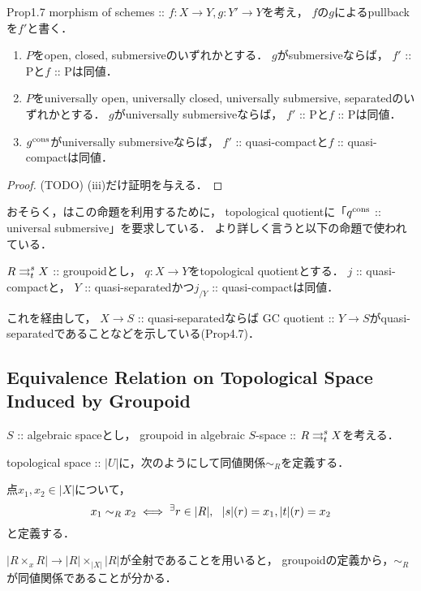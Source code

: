 \begin{Prop}{\cite{Rydh10} Prop1.7} \label{refrecting_property_of_pullback}
    morphism of schemes :: $f \colon X \to Y, g \colon Y' \to Y$を考え，
    $f$の$g$によるpullbackを$f'$と書く．
    \begin{enumerate}
    \item 
        $P$をopen, closed, submersiveのいずれかとする．
        $g$がsubmersiveならば，
        $f'$ :: Pと$f$ :: Pは同値．
    \item 
        $P$をuniversally open, universally closed, universally submersive, separatedのいずれかとする．
        $g$がuniversally submersiveならば，
        $f'$ :: Pと$f$ :: Pは同値．
    \item 
        $g^{\mathrm{cons}}$がuniversally submersiveならば，
        $f'$ :: quasi-compactと$f$ :: quasi-compactは同値．
    \end{enumerate}
\end{Prop}
\begin{proof}
    (TODO)
    (iii)だけ証明を与える．
\end{proof}

\begin{Remark}
    おそらく，\cite{Rydh13}はこの命題を利用するために，
    topological quotientに「$q^{\mathrm{cons}}$ :: universal submersive」を要求している．
    より詳しく言うと以下の命題で使われている．
    \begin{Prop}
        $R \mathrel{\mathop{\rightrightarrows}^{s}_{t}} X$ :: groupoidとし，
        $q \colon X \to Y$をtopological quotientとする．
        $j$ :: quasi-compactと，
        $Y$ :: quasi-separatedかつ$j_{/Y}$ :: quasi-compactは同値．
    \end{Prop}
    これを経由して，
    $X \to S$ :: quasi-separatedならば
    GC quotient :: $Y \to S$がquasi-separatedであることなどを示している(Prop4.7)．
\end{Remark}

\subsection{Equivalence Relation on Topological Space Induced by Groupoid}
$S$ :: algebraic spaceとし，
groupoid in algebraic $S$-space :: $R \mathrel{\mathop{\rightrightarrows}^{s}_{t}} X$を考える．

topological space :: $|U|$に，次のようにして同値関係$\sim_{R}$を定義する．
\begin{Def}
    点$x_1, x_2 \in |X|$について，
    \[ x_1 \sim_R x_2 \iff {}^{\exists} r \in |R|,~~ |s|(r)=x_1, |t|(r)=x_2 \]
    と定義する．
\end{Def}
$|R \times_{x} R| \to |R| \times_{|X|} |R|$が全射であることを用いると，
groupoidの定義から，$\sim_R$が同値関係であることが分かる．

